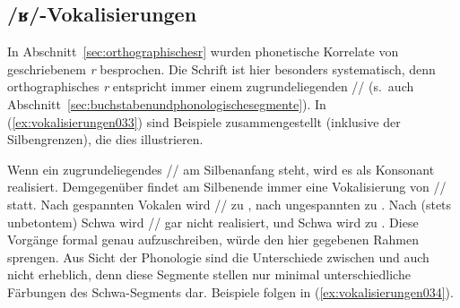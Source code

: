 
\begin{exe}
  \ex\label{ex:verteilungvonund032}
  \begin{xlist}
  \end{xlist}
\end{exe}

\subsection{/ʁ/-Vokalisierungen}
\label{sec:vokalisierungen}

In Abschnitt~\ref{sec:orthographischesr} wurden phonetische Korrelate von geschriebenem \textit{r} besprochen.
Die Schrift ist hier besonders systematisch, denn orthographisches \textit{r} entspricht immer einem zugrundeliegenden // (s.\ auch Abschnitt~\ref{sec:buchstabenundphonologischesegmente}).
In (\ref{ex:vokalisierungen033}) sind Beispiele zusammengestellt (inklusive der Silbengrenzen), die dies illustrieren.

\begin{exe}
  \ex\label{ex:vokalisierungen033}
  \begin{xlist}
  \end{xlist}
\end{exe}

Wenn ein zugrundeliegendes // am Silbenanfang steht, wird es als Konsonant \textipa{[K]} realisiert.
Demgegenüber findet am Silbenende immer eine Vokalisierung von // statt.
Nach gespannten Vokalen wird // zu \textipa{[5]}, nach ungespannten zu \textipa{[@]}.
Nach (stets unbetontem) Schwa wird // gar nicht realisiert, und Schwa wird zu \textipa{[5]}.
Diese Vorgänge formal genau aufzuschreiben, würde den hier gegebenen Rahmen sprengen.
Aus Sicht der Phonologie sind die Unterschiede zwischen \textipa{[@]} und \textipa{[5]} auch nicht erheblich, denn diese Segmente stellen nur minimal unterschiedliche Färbungen des Schwa-Segments dar.
Beispiele folgen in (\ref{ex:vokalisierungen034}).

